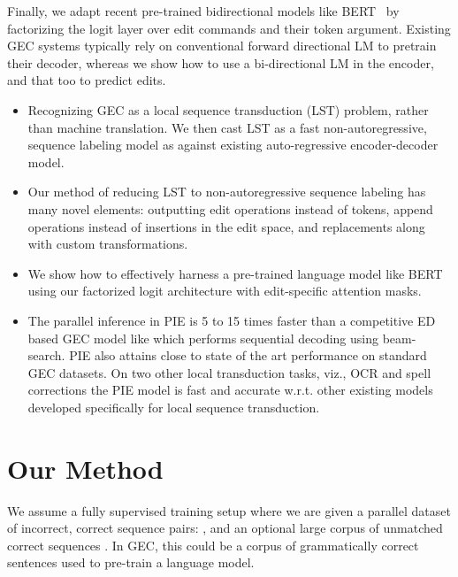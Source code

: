 \documentclass[11pt,a4paper]{article}
\begin{document}
Finally, we adapt recent pre-trained bidirectional models like BERT~\cite{devlin2018bert} by factorizing the logit layer over edit commands and their token argument.  Existing GEC systems typically rely on conventional forward directional LM to pretrain their decoder, whereas we show how to use a bi-directional LM in the encoder, and that too to predict edits.\\  

\begin{itemize}[leftmargin=*]
\item Recognizing GEC as a local sequence transduction (LST) problem, rather than machine translation. We then cast LST as a fast non-autoregressive, sequence labeling model as against existing auto-regressive encoder-decoder model.
\item Our method of reducing LST to non-autoregressive sequence labeling has many novel elements: outputting edit operations instead of tokens, append operations instead of insertions in the edit space, and replacements along with custom transformations.
\item We show how to effectively harness a pre-trained language model like BERT using our factorized logit architecture with edit-specific attention masks.
\item The parallel inference in PIE is 5 to 15 times faster than a competitive ED based GEC model like \cite{lichtarge2019} which performs sequential decoding using beam-search. PIE also attains close to state of the art performance on standard GEC datasets. On two other local transduction tasks, viz., OCR and spell corrections the PIE model is fast and accurate w.r.t. other existing models developed specifically for local sequence transduction.
\end{itemize}

\section{Our Method} \label{sec:method}
We assume a fully supervised training setup where we are given a parallel dataset of incorrect, correct sequence pairs: , and an optional  large corpus of unmatched correct sequences . 
In GEC, this could be a corpus of grammatically correct sentences used to pre-train a language model.  
\end{document}
